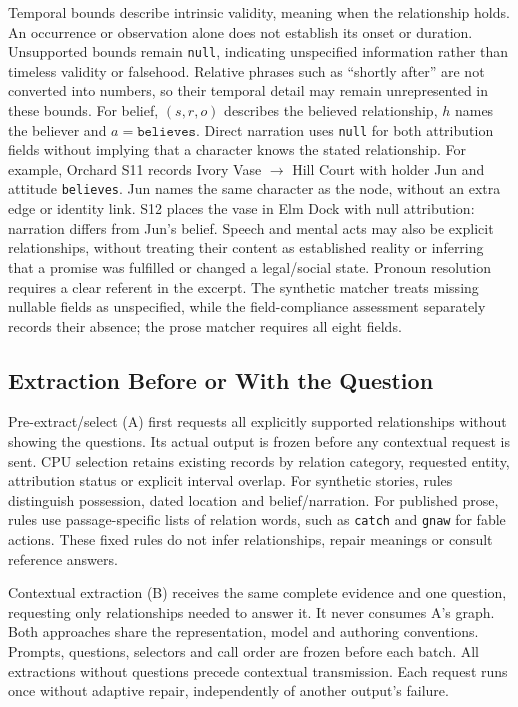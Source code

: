 \documentclass[a4paper,twoside]{article}
\begin{document}
Temporal bounds describe intrinsic validity, meaning when the relationship holds. An occurrence or observation alone does not establish its onset or duration. Unsupported bounds remain \texttt{null}, indicating unspecified information rather than timeless validity or falsehood. Relative phrases such as ``shortly after'' are not converted into numbers, so their temporal detail may remain unrepresented in these bounds.
For belief, $(s,r,o)$ describes the believed relationship, $h$ names the believer and $a=\texttt{believes}$. Direct narration uses \texttt{null} for both attribution fields without implying that a character knows the stated relationship. For example, Orchard S11 records Ivory Vase $\rightarrow$ Hill Court with holder Jun and attitude \texttt{believes}. Jun names the same character as the node, without an extra edge or identity link. S12 places the vase in Elm Dock with null attribution: narration differs from Jun's belief. Speech and mental acts may also be explicit relationships, without treating their content as established reality or inferring that a promise was fulfilled or changed a legal/social state.
Pronoun resolution requires a clear referent in the excerpt. The synthetic matcher treats missing nullable fields as unspecified, while the field-compliance assessment separately records their absence; the prose matcher requires all eight fields.



\subsection{Extraction Before or With the Question}
\noindent Pre-extract/select (A) first requests all explicitly supported relationships without showing the questions. Its actual output is frozen before any contextual request is sent. CPU selection retains existing records by relation category, requested entity, attribution status or explicit interval overlap. For synthetic stories, rules distinguish possession, dated location and belief/narration. For published prose, rules use passage-specific lists of relation words, such as \texttt{catch} and \texttt{gnaw} for fable actions. These fixed rules do not infer relationships, repair meanings or consult reference answers.

Contextual extraction (B) receives the same complete evidence and one question, requesting only relationships needed to answer it. It never consumes A's graph. Both approaches share the representation, model and authoring conventions. Prompts, questions, selectors and call order are frozen before each batch. All extractions without questions precede contextual transmission. Each request runs once without adaptive repair, independently of another output's failure.
\end{document}
